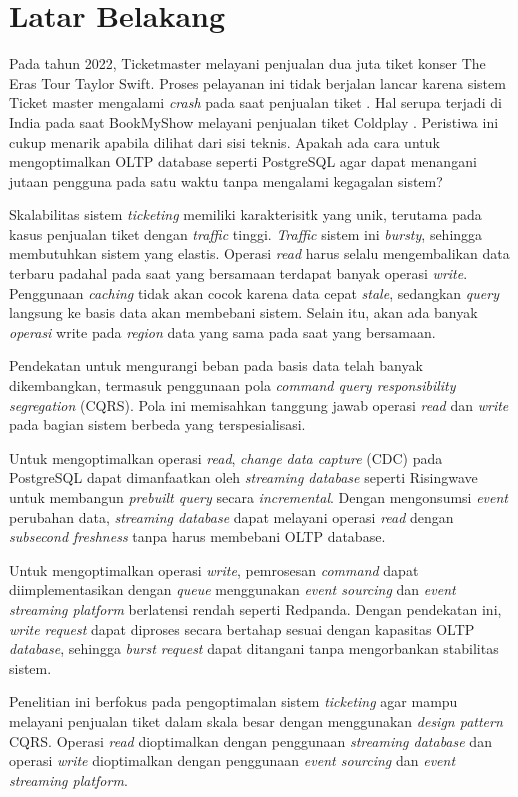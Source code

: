 \section{Latar Belakang}
\label{sec:latar-belakang}

Pada tahun 2022, Ticketmaster melayani penjualan dua juta tiket konser The Eras Tour Taylor Swift. Proses pelayanan ini tidak berjalan lancar karena sistem Ticket master mengalami \textit{crash} pada saat penjualan tiket \parencite{swiftTicketmaster}. Hal serupa terjadi di India pada saat BookMyShow melayani penjualan tiket Coldplay \parencite{coldplayBookMyShow}. Peristiwa ini cukup menarik apabila dilihat dari sisi teknis. Apakah ada cara untuk mengoptimalkan OLTP database seperti PostgreSQL agar dapat menangani jutaan pengguna pada satu waktu tanpa mengalami kegagalan sistem?

Skalabilitas sistem \textit{ticketing} memiliki karakterisitk yang unik, terutama pada kasus penjualan tiket dengan \textit{traffic} tinggi. \textit{Traffic} sistem ini \textit{bursty}, sehingga membutuhkan sistem yang elastis. Operasi \textit{read} harus selalu mengembalikan data terbaru padahal pada saat yang bersamaan terdapat banyak operasi \textit{write}. Penggunaan \textit{caching} tidak akan cocok karena data cepat \textit{stale}, sedangkan \textit{query} langsung ke basis data akan membebani sistem. Selain itu, akan ada banyak \textit{operasi} write pada \textit{region} data yang sama pada saat yang bersamaan.

Pendekatan untuk mengurangi beban pada basis data telah banyak dikembangkan, termasuk penggunaan pola \textit{command query responsibility segregation} (CQRS). Pola ini memisahkan tanggung jawab operasi \textit{read} dan \textit{write} pada bagian sistem berbeda yang terspesialisasi.

Untuk mengoptimalkan operasi \textit{read}, \textit{change data capture} (CDC) pada PostgreSQL dapat dimanfaatkan oleh \textit{streaming database} seperti Risingwave untuk membangun \textit{prebuilt query} secara \textit{incremental}. Dengan mengonsumsi \textit{event} perubahan data, \textit{streaming database} dapat melayani operasi \textit{read} dengan \textit{subsecond freshness} tanpa harus membebani OLTP database.

Untuk mengoptimalkan operasi \textit{write}, pemrosesan \textit{command} dapat diimplementasikan dengan \textit{queue} menggunakan \textit{event sourcing} dan \textit{event streaming platform} berlatensi rendah seperti Redpanda. Dengan pendekatan ini, \textit{write request} dapat diproses secara bertahap sesuai dengan kapasitas OLTP \textit{database}, sehingga \textit{burst request} dapat ditangani tanpa mengorbankan stabilitas sistem.

Penelitian ini berfokus pada pengoptimalan sistem \textit{ticketing} agar mampu melayani penjualan tiket dalam skala besar dengan menggunakan \textit{design pattern} CQRS. Operasi \textit{read} dioptimalkan dengan penggunaan \textit{streaming database} dan operasi \textit{write} dioptimalkan dengan penggunaan \textit{event sourcing} dan \textit{event streaming platform}.

